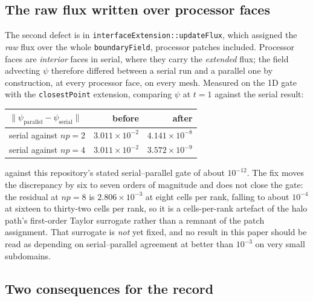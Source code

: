\documentclass[preprint,3p,11pt]{elsarticle}
\newcommand{\psilev}{\psi}
\begin{document}
\subsection{The raw flux written over processor faces}
\label{sec:extfluxdefect}

The second defect is in \texttt{interfaceExtension::updateFlux}, which assigned the
\emph{raw} flux over the whole \texttt{boundaryField}, processor patches included.
Processor faces are \emph{interior} faces in serial, where they carry the
\emph{extended} flux; the field advecting $\psilev$ therefore differed between a
serial run and a parallel one by construction, at every processor face, on every
mesh. Measured on the 1D gate with the \texttt{closestPoint} extension, comparing
$\psilev$ at $t=1$ against the serial result:
\begin{center}
\begin{tabular}{lrr}
\toprule
$\|\psilev_{\text{parallel}} - \psilev_{\text{serial}}\|$ & before & after \\
\midrule
serial against $np=2$ & $3.011\times10^{-2}$ & $4.141\times10^{-8}$ \\
serial against $np=4$ & $3.011\times10^{-2}$ & $3.572\times10^{-9}$ \\
\bottomrule
\end{tabular}
\end{center}
against this repository's stated serial--parallel gate of about $10^{-12}$. The
fix moves the discrepancy by six to seven orders of magnitude and does not close
the gate: the residual at $np=8$ is $2.806\times10^{-3}$ at eight cells per rank,
falling to about $10^{-4}$ at sixteen to thirty-two cells per rank, so it is a
cells-per-rank artefact of the halo path's first-order Taylor surrogate rather
than a remnant of the patch assignment. That surrogate is \emph{not} yet fixed, and
no result in this paper should be read as depending on serial--parallel agreement
at better than $10^{-3}$ on very small subdomains.

\subsection{Two consequences for the record}
\label{sec:coupledpatch-consequences}
\end{document}
